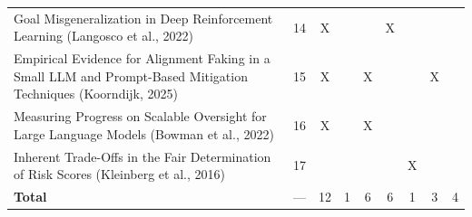 \begin{landscape}
\begin{longtable}{|p{14cm}|c|c|c|c|c|c|c|c|}
		Goal Misgeneralization in Deep Reinforcement Learning (Langosco et al., 2022)                                    & 14          & X                                  &                                                           &                                                       & X                                                          &                                           &                                              &                                                    \\
		Empirical Evidence for Alignment Faking in a Small LLM and Prompt-Based Mitigation Techniques (Koorndijk, 2025) & 15 & X &  & X & & & X & \\
		Measuring Progress on Scalable Oversight for Large Language Models (Bowman et al., 2022) & 16 & X & & X & & & & \\
		Inherent Trade-Offs in the Fair Determination of Risk Scores (Kleinberg et al., 2016)    & 17 & & & & & X & & \\
		\hline
\textbf{Total} & --- & 12 & 1 & 6 & 6 & 1 & 3 & 4 \\
		\hline
	\end{longtable}

\end{landscape}
